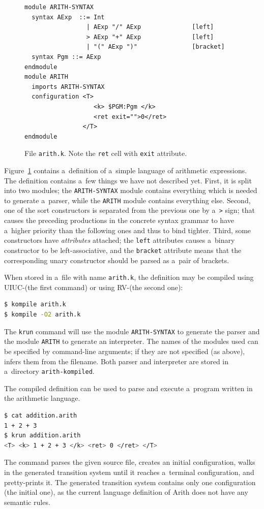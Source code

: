 \documentclass{fithesis3}
\newcommand{\krun}{\texttt{krun}\xspace}
\begin{document}
\begin{figure}
\begin{lstlisting}
module ARITH-SYNTAX
  syntax AExp  ::= Int
                 | AExp "/" AExp              [left]
                 > AExp "+" AExp              [left]
                 | "(" AExp ")"               [bracket]
  syntax Pgm ::= AExp
endmodule
module ARITH
  imports ARITH-SYNTAX  
  configuration <T>
                   <k> $PGM:Pgm </k>
                   <ret exit="">0</ret>
                </T>
endmodule
\end{lstlisting}
\caption{File \texttt{arith.k}. Note the \texttt{ret} cell with \texttt{exit} attribute.}
\label{arithSource}
\end{figure}

Figure~\ref{arithSource} contains a~definition of a~simple language of arithmetic expressions. The definition contains a~few things we have not described yet. First, it is split into two modules; the \texttt{ARITH-SYNTAX} module contains everything which is needed to generate a~parser, while the \texttt{ARITH} module contains everything else. Second, one of the sort constructors is separated from the previous one by a~\lstinline{>} sign; that causes the preceding productions in the concrete syntax grammar to have a~higher priority than the following ones and thus to bind tighter. Third, some constructors have \textit{attributes} attached; the \texttt{left} attributes causes a~binary constructor to be left-associative, and the \texttt{bracket} attribute means that the corresponding unary constructor should be parsed as a~pair of brackets.

When stored in a~file with name \texttt{arith.k}, the definition may be compiled using UIUC-\K (the first command) or using RV-\K (the second one):
\begin{lstlisting}[language=bash]
$ kompile arith.k
$ kompile -O2 arith.k
\end{lstlisting}
The \krun command will use the module \texttt{ARITH-SYNTAX} to generate the parser and the module \texttt{ARITH} to generate an interpreter. The names of the modules used can be specified by command-line arguments; if they are not specified (as above), \K infers them from the filename. Both parser and interpreter are stored in a~directory \texttt{arith-kompiled}.

The compiled definition can be used to parse and execute a~program written in the arithmetic language.
\begin{lstlisting}[language=bash]
$ cat addition.arith
1 + 2 + 3
$ krun addition.arith
<T> <k> 1 + 2 + 3 </k> <ret> 0 </ret> </T>
\end{lstlisting}
The command parses the given source file, creates an initial configuration, walks in the generated transition system until it reaches a~terminal configuration, and pretty-prints it. The generated transition system contains only one configuration (the initial one), as the current language definition of Arith does not have any semantic rules.
\end{document}
